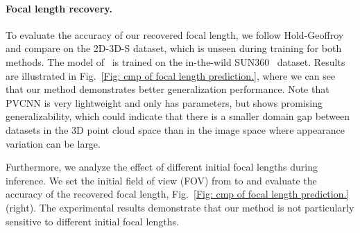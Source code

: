 \paragraph{Focal length recovery.}

To evaluate the accuracy of our recovered focal length, we follow Hold-Geoffroy~\etal~\cite{hold2018perceptual} and compare on the 2D-3D-S dataset, which is unseen during training for both methods. 
The model of~\cite{hold2018perceptual} is trained on the in-the-wild SUN360~\cite{xiao2012recognizing} dataset. 
Results are illustrated in Fig.~\ref{Fig: cmp of focal length prediction.}, where we can see that our method demonstrates better generalization performance.
Note that PVCNN is very lightweight and only has  parameters, but shows promising generalizability, which could indicate that there is a smaller domain gap between datasets in the 3D point cloud space than in the image space where appearance variation can be large.


Furthermore, we analyze the effect of different initial focal lengths during inference. 
We set the initial field of view (FOV) from  to  and evaluate the accuracy of the recovered focal length, Fig.~\ref{Fig: cmp of focal length prediction.} (right). 
The experimental results demonstrate that our method is not particularly sensitive to different initial focal lengths.


